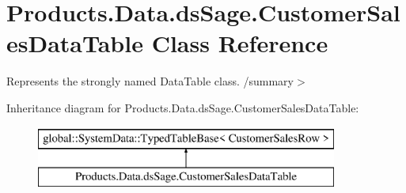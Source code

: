 \hypertarget{class_products_1_1_data_1_1ds_sage_1_1_customer_sales_data_table}{}\section{Products.\+Data.\+ds\+Sage.\+Customer\+Sales\+Data\+Table Class Reference}
\label{class_products_1_1_data_1_1ds_sage_1_1_customer_sales_data_table}


Represents the strongly named Data\+Table class. /summary$>$  


Inheritance diagram for Products.\+Data.\+ds\+Sage.\+Customer\+Sales\+Data\+Table\+:\begin{figure}[H]
\begin{center}
\leavevmode
\includegraphics[height=2.000000cm]{class_products_1_1_data_1_1ds_sage_1_1_customer_sales_data_table}
\end{center}
\end{figure}
